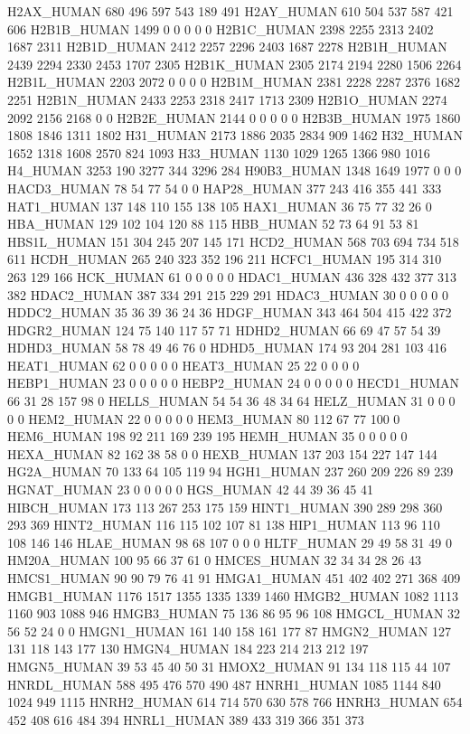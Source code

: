 H2AX_HUMAN	680	496	597	543	189	491
H2AY_HUMAN	610	504	537	587	421	606
H2B1B_HUMAN	1499	0	0	0	0	0
H2B1C_HUMAN	2398	2255	2313	2402	1687	2311
H2B1D_HUMAN	2412	2257	2296	2403	1687	2278
H2B1H_HUMAN	2439	2294	2330	2453	1707	2305
H2B1K_HUMAN	2305	2174	2194	2280	1506	2264
H2B1L_HUMAN	2203	2072	0	0	0	0
H2B1M_HUMAN	2381	2228	2287	2376	1682	2251
H2B1N_HUMAN	2433	2253	2318	2417	1713	2309
H2B1O_HUMAN	2274	2092	2156	2168	0	0
H2B2E_HUMAN	2144	0	0	0	0	0
H2B3B_HUMAN	1975	1860	1808	1846	1311	1802
H31_HUMAN	2173	1886	2035	2834	909	1462
H32_HUMAN	1652	1318	1608	2570	824	1093
H33_HUMAN	1130	1029	1265	1366	980	1016
H4_HUMAN	3253	190	3277	344	3296	284
H90B3_HUMAN	1348	1649	1977	0	0	0
HACD3_HUMAN	78	54	77	54	0	0
HAP28_HUMAN	377	243	416	355	441	333
HAT1_HUMAN	137	148	110	155	138	105
HAX1_HUMAN	36	75	77	32	26	0
HBA_HUMAN	129	102	104	120	88	115
HBB_HUMAN	52	73	64	91	53	81
HBS1L_HUMAN	151	304	245	207	145	171
HCD2_HUMAN	568	703	694	734	518	611
HCDH_HUMAN	265	240	323	352	196	211
HCFC1_HUMAN	195	314	310	263	129	166
HCK_HUMAN	61	0	0	0	0	0
HDAC1_HUMAN	436	328	432	377	313	382
HDAC2_HUMAN	387	334	291	215	229	291
HDAC3_HUMAN	30	0	0	0	0	0
HDDC2_HUMAN	35	36	39	36	24	36
HDGF_HUMAN	343	464	504	415	422	372
HDGR2_HUMAN	124	75	140	117	57	71
HDHD2_HUMAN	66	69	47	57	54	39
HDHD3_HUMAN	58	78	49	46	76	0
HDHD5_HUMAN	174	93	204	281	103	416
HEAT1_HUMAN	62	0	0	0	0	0
HEAT3_HUMAN	25	22	0	0	0	0
HEBP1_HUMAN	23	0	0	0	0	0
HEBP2_HUMAN	24	0	0	0	0	0
HECD1_HUMAN	66	31	28	157	98	0
HELLS_HUMAN	54	54	36	48	34	64
HELZ_HUMAN	31	0	0	0	0	0
HEM2_HUMAN	22	0	0	0	0	0
HEM3_HUMAN	80	112	67	77	100	0
HEM6_HUMAN	198	92	211	169	239	195
HEMH_HUMAN	35	0	0	0	0	0
HEXA_HUMAN	82	162	38	58	0	0
HEXB_HUMAN	137	203	154	227	147	144
HG2A_HUMAN	70	133	64	105	119	94
HGH1_HUMAN	237	260	209	226	89	239
HGNAT_HUMAN	23	0	0	0	0	0
HGS_HUMAN	42	44	39	36	45	41
HIBCH_HUMAN	173	113	267	253	175	159
HINT1_HUMAN	390	289	298	360	293	369
HINT2_HUMAN	116	115	102	107	81	138
HIP1_HUMAN	113	96	110	108	146	146
HLAE_HUMAN	98	68	107	0	0	0
HLTF_HUMAN	29	49	58	31	49	0
HM20A_HUMAN	100	95	66	37	61	0
HMCES_HUMAN	32	34	34	28	26	43
HMCS1_HUMAN	90	90	79	76	41	91
HMGA1_HUMAN	451	402	402	271	368	409
HMGB1_HUMAN	1176	1517	1355	1335	1339	1460
HMGB2_HUMAN	1082	1113	1160	903	1088	946
HMGB3_HUMAN	75	136	86	95	96	108
HMGCL_HUMAN	32	56	52	24	0	0
HMGN1_HUMAN	161	140	158	161	177	87
HMGN2_HUMAN	127	131	118	143	177	130
HMGN4_HUMAN	184	223	214	213	212	197
HMGN5_HUMAN	39	53	45	40	50	31
HMOX2_HUMAN	91	134	118	115	44	107
HNRDL_HUMAN	588	495	476	570	490	487
HNRH1_HUMAN	1085	1144	840	1024	949	1115
HNRH2_HUMAN	614	714	570	630	578	766
HNRH3_HUMAN	654	452	408	616	484	394
HNRL1_HUMAN	389	433	319	366	351	373
